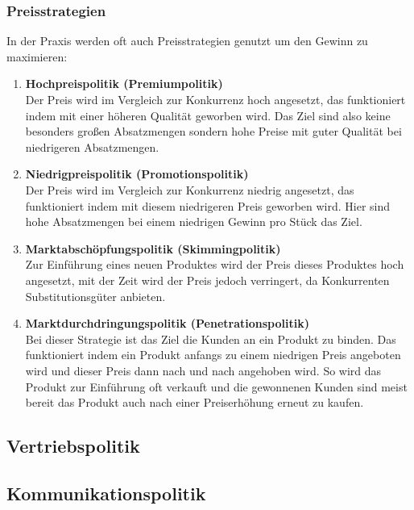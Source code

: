 \subsubsection{Preisstrategien}
\begin{flushleft}
    In der Praxis werden oft auch Preisstrategien genutzt um den Gewinn zu maximieren:
    \begin{enumerate}
        \item {
            \textbf{Hochpreispolitik (Premiumpolitik)} \\
            Der Preis wird im Vergleich zur Konkurrenz hoch angesetzt, das funktioniert indem mit einer höheren Qualität geworben wird.
            Das Ziel sind also keine besonders großen Absatzmengen sondern hohe Preise mit guter Qualität bei niedrigeren Absatzmengen.
        }
        \item {
            \textbf{Niedrigpreispolitik (Promotionspolitik)} \\
            Der Preis wird im Vergleich zur Konkurrenz niedrig angesetzt, das funktioniert indem mit diesem niedrigeren Preis geworben wird.
            Hier sind hohe Absatzmengen bei einem niedrigen Gewinn pro Stück das Ziel.
        }
        \item {
            \textbf{Marktabschöpfungspolitik (Skimmingpolitik)} \\
            Zur Einführung eines neuen Produktes wird der Preis dieses Produktes hoch angesetzt, mit der Zeit wird der Preis jedoch verringert,
            da Konkurrenten Substitutionsgüter anbieten.
        }
        \item {
            \textbf{Marktdurchdringungspolitik (Penetrationspolitik)} \\
            Bei dieser Strategie ist das Ziel die Kunden an ein Produkt zu binden.
            Das funktioniert indem ein Produkt anfangs zu einem niedrigen Preis angeboten wird und dieser Preis dann nach und nach
            angehoben wird. So wird das Produkt zur Einführung oft verkauft und die gewonnenen Kunden sind meist
            bereit das Produkt auch nach einer Preiserhöhung erneut zu kaufen.
        }
    \end{enumerate}
\end{flushleft}

\subsection{Vertriebspolitik}
\subsection{Kommunikationspolitik}

